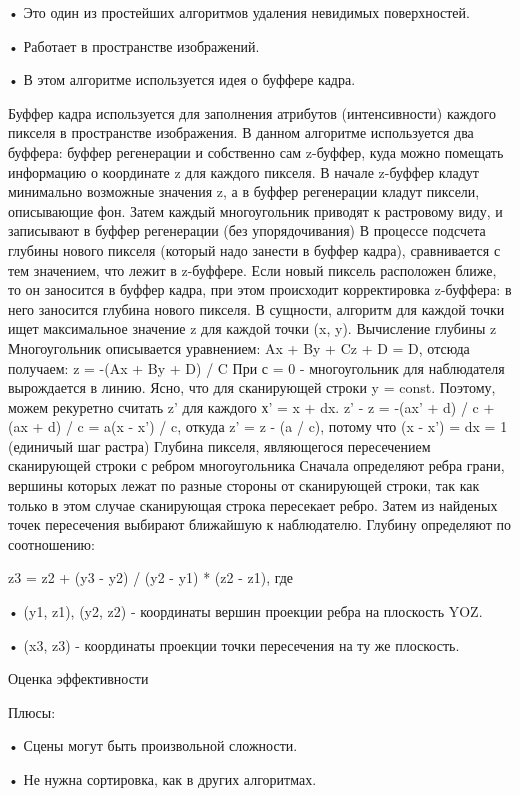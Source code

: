     • Это один из простейших алгоритмов удаления невидимых поверхностей.
    
    • Работает в пространстве изображений.
    
    • В этом алгоритме используется идея о буффере кадра.
    
Буффер кадра используется для заполнения атрибутов (интенсивности) каждого пикселя в пространстве изображения.
 В данном алгоритме используется два буффера: буффер регенерации и собственно сам z-буффер, куда можно помещать информацию о координате z для каждого пикселя.
В начале z-буффер кладут минимально возможные значения z, а в буффер регенерации кладут пиксели, описывающие фон.
 Затем каждый многоугольник приводят к растровому виду, и записывают в буффер регенерации (без упорядочивания)
В процессе подсчета глубины нового пикселя (который надо занести в буффер кадра), сравнивается с тем значением, что лежит в z-буффере. Если новый пиксель расположен ближе, то он заносится в буффер кадра, при этом происходит корректировка z-буффера: в него заносится глубина нового пикселя. В сущности, алгоритм для каждой точки ищет максимальное значение z для каждой точки (x, y).
Вычисление глубины z
Многоугольник описывается уравнением: Ax + By + Cz + D = D, отсюда получаем:
 z = -(Ax + By + D) / C При с = 0 - многоугольник для наблюдателя вырождается в линию.
 Ясно, что для сканирующей строки y = const. Поэтому, можем рекуретно считать z' для каждого х' = x + dx.
z' - z = -(ax' + d) / c + (ax + d) / c = a(x - x') / c, откуда z' = z - (a / c), потому что (x - x') = dx = 1 (единичый шаг растра)
Глубина пикселя, являющегося пересечением сканирующей строки с ребром многоугольника
Сначала определяют ребра грани, вершины которых лежат по разные стороны от сканирующей строки, так как только в этом случае сканирующая строка пересекает ребро. Затем из найденых точек пересечения выбирают ближайшую к наблюдателю.
Глубину определяют по соотношению:

z3 = z2 + (y3 - y2) / (y2 - y1) * (z2 - z1), где
    
    • (y1, z1), (y2, z2) - координаты вершин проекции ребра на плоскость YOZ.
    
    • (x3, z3) - координаты проекции точки пересечения на ту же плоскость.

Оценка эффективности

Плюсы:

    • Сцены могут быть произвольной сложности.
    
    • Не нужна сортировка, как в других алгоритмах.
    
